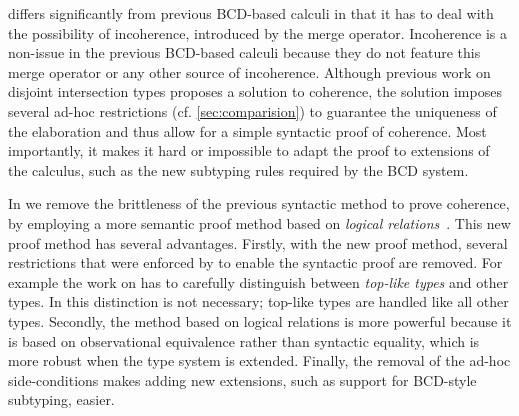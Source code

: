 
\namee differs significantly from previous BCD-based calculi in that it has to
deal with the possibility of incoherence, introduced by the merge operator. Incoherence
is a non-issue in the previous BCD-based calculi because they do not feature
this merge operator or any other source of incoherence.
Although previous work on disjoint intersection types
proposes a solution to coherence, the solution imposes several ad-hoc restrictions (cf. \cref{sec:comparision})
to guarantee the uniqueness of the elaboration and thus allow for a simple
syntactic proof of coherence. Most
importantly, it makes it hard or impossible to adapt the proof to extensions of
the calculus, such as the new subtyping rules required by the BCD system.

In \namee we remove the brittleness of the previous syntactic method to prove
coherence, by employing a more semantic proof method based on \emph{logical
  relations}~\citep{tait, plotkin1973lambda, statman1985logical}. This new proof method has several
advantages. Firstly, with the new proof method, several restrictions that were
enforced by \oname to enable the syntactic proof are removed. For example
the work on \oname has to carefully distinguish between \emph{top-like types} and other types.
In \namee this distinction is not necessary; top-like types are handled like all
other types. Secondly, the method based on logical relations is more powerful
because it is based on observational equivalence rather than syntactic equality,
which is more robust when the type system is extended. Finally, the removal of
the ad-hoc side-conditions makes adding new extensions, such as support for
BCD-style subtyping, easier.





% 



